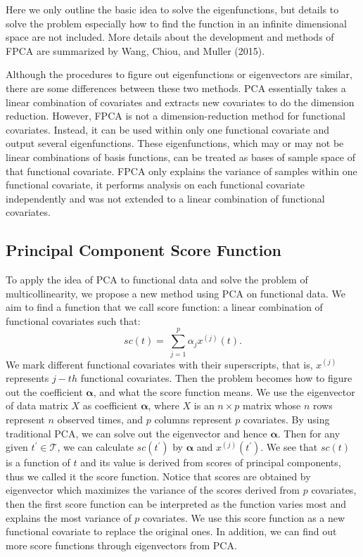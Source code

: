 Here we only outline the basic idea to solve the eigenfunctions, but details to solve the problem especially how to find the function in an infinite dimensional space are not included. More details about the development and methods of FPCA are summarized by Wang, Chiou, and Muller (2015).

Although the procedures to figure out eigenfunctions or eigenvectors are similar, there are some differences between these two methods. PCA essentially takes a linear combination of covariates and extracts new covariates to do the dimension reduction. However, FPCA is not a dimension-reduction method for functional covariates. Instead, it can be used within only one functional covariate and output several eigenfunctions. These eigenfunctions, which may or may not be linear combinations of basis functions, can be treated as bases of sample space of that functional covariate. FPCA only explains the variance of samples within one functional covariate, it performs analysis on each functional covariate independently and was not extended to a linear combination of functional covariates. 

\subsection{Principal Component Score Function}
To apply the idea of PCA to functional data and solve the problem of multicollinearity, we propose a new method using PCA on functional data. We aim to find a function that we call score function: a linear combination of functional covariates such that:
$$sc\left(t\right)=\ \sum_{j=1}^{p}{\alpha_jx^{(j)}(t)}.$$
We mark different functional covariates with their superscripts, that is, $x^{(j)}$ represents $j-th$ functional covariates. Then the problem becomes how to figure out the coefficient $\bm \alpha$, and what the score function means. We use the eigenvector of data matrix $X$ as coefficient $\bm \alpha$, where $X$ is an $n\times p$ matrix whose $n$ rows represent $n$ observed times, and $p$ columns represent $p$ covariates. By using traditional PCA, we can solve out the eigenvector and hence $\bm \alpha$. Then for any given $t^{\prime}\in \mathcal{T}$, we can calculate $sc(t^{\prime})$ by $\bm \alpha$ and $x^{(j)}(t^{\prime})$. We see that $sc(t)$ is a function of $t$ and its value is derived from scores of principal components, thus we called it the score function. Notice that scores are obtained by eigenvector which maximizes the variance of the scores derived from $p$ covariates, then the first score function can be interpreted as the function varies most and explains the most variance of $p$ covariates. We use this score function as a new functional covariate to replace the original ones. In addition, we can find out more score functions through eigenvectors from PCA. 

